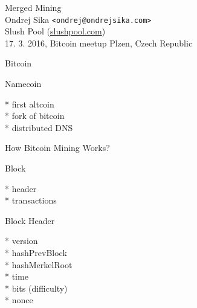 \documentclass{beamer}
\begin{document}
\Large
\begin{frame}

    {\LARGE Merged Mining}\\
    \vspace{7mm}
    {\Large Ondrej Sika \lstinline|<ondrej@ondrejsika.com>|}\\
    \vspace{7mm}
    {\large Slush Pool (\url{slushpool.com})}\\
    \vspace{7mm}
    17. 3. 2016,  Bitcoin meetup Plzen, Czech Republic\\

\end{frame}

\begin{frame}

    {\Huge Bitcoin}\\

\end{frame}

\begin{frame}

    {\Huge Namecoin}\\

    \vspace{5mm}

    * first altcoin\\
    * fork of bitcoin\\
    * distributed DNS\\

\end{frame}

\begin{frame}

    {\Huge How Bitcoin Mining Works?}\\

\end{frame}

\begin{frame}

    {\Huge Block}\\

    \vspace{5mm}

    * header\\
    * transactions\\


\end{frame}

\begin{frame}

    {\Huge Block Header}\\

    \vspace{5mm}

    * version\\
    * hashPrevBlock\\
    * hashMerkelRoot\\
    * time\\
    * bits (difficulty)\\
    * nonce\\

\end{frame}
\end{document}
